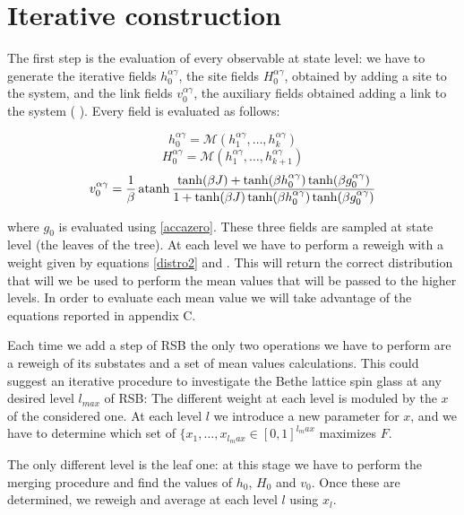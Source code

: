 \section{Iterative construction}

The first step is the evaluation of every observable at state level: we have to generate the iterative fields $h_0^{\alpha\gamma}$, the site fields $H_0^{\alpha\gamma}$, obtained by adding a site to the system, and the link fields $v_0^{\alpha\gamma}$, the auxiliary fields obtained adding a link to the system (\cite{bethe} ). Every field is evaluated as follows:

\begin{equation}
h_0^{\alpha\gamma} = \mathcal{M}(h_1^{\alpha\gamma},\ldots,h_k^{\alpha\gamma})
\label{accazero}
\end{equation}
\begin{equation}
H_0^{\alpha\gamma} = \mathcal{M}(h_1^{\alpha\gamma},\ldots,h_{k+1}^{\alpha\gamma})
\end{equation}
\begin{equation}
v_0^{\alpha\gamma} = {1\over\beta}\operatorname{atanh}\frac{\tanh(\beta J) + \tanh(\beta h_0^{\alpha\gamma})\tanh(\beta g_0^{\alpha\gamma})}{1+\tanh(\beta J)\tanh(\beta  h_0^{\alpha\gamma})\tanh(\beta g_0^{\alpha\gamma})}
\end{equation}

where $g_0$ is evaluated using \ref{accazero}. These three fields are sampled at state level (the leaves of the tree). At each level we have to perform a reweigh with a weight given by equations \ref{distro2} and \label{distro1}. This will return the correct distribution that will we be used to perform the mean values that will be passed to the higher levels.
In order to evaluate each mean value we will take advantage of the equations reported in appendix C. 

Each time we add a step of RSB the only two operations we have to perform are a reweigh of its substates and a set of mean values calculations. This could suggest an iterative procedure to investigate the Bethe lattice spin glass at any desired level $l_{max}$ of RSB: 
The different weight at each level is moduled by the $x$ of the considered one. At each level $l$ we introduce a new parameter for $x$, and we have to determine which set of $\{x_1,\ldots ,x_{l_max} \in [0,1]^{l_max}$ maximizes $F$.

The only different level is the leaf one: at this stage we have to perform the merging procedure and find the values of $h_0$, $H_0$ and $v_0$. Once these are determined, we reweigh and average at each level $l$ using $x_l$.














